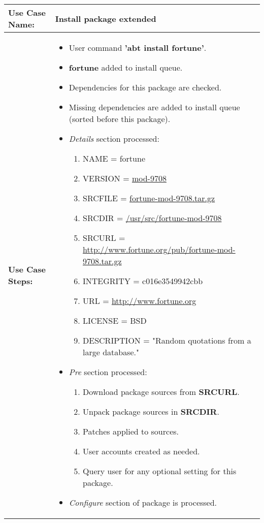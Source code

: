 \medskip

\begin{tabularx}{\linewidth}{|l|X|}
\hline
\textbf{Use Case Name:} & \textbf{Install package extended} \\
\hline
\textbf{Use Case Steps:} & 
\begin{minipage}{\linewidth} 
  \vspace{0.05em}
  \begin{itemize}
    \item User command \textbf{'abt install fortune'}.
    \item \textbf{fortune} added to install queue.
    \item Dependencies for this package are checked.
    \item Missing dependencies are added to install queue (sorted before this package).
    \item \emph{Details} section processed:
    \begin{enumerate}
      \item NAME = fortune
      \item VERSION = \url{mod-9708}
      \item SRCFILE = \url{fortune-mod-9708.tar.gz}
      \item SRCDIR = \url{/usr/src/fortune-mod-9708}
      \item SRCURL = \url{http://www.fortune.org/pub/fortune-mod-9708.tar.gz}
      \item INTEGRITY = c016e3549942cbb
      \item URL = \url{http://www.fortune.org}
      \item LICENSE = BSD
      \item DESCRIPTION = "Random quotations from a large database."
    \end{enumerate}
    \item \emph{Pre} section processed:
    \begin{enumerate}
      \item Download package sources from \textbf{SRCURL}.
      \item Unpack package sources in \textbf{SRCDIR}.
      \item Patches applied to sources.
      \item User accounts created as needed.
      \item Query user for any optional setting for this package.
    \end{enumerate}
    \item \emph{Configure} section of package is processed.

\end{itemize}
\end{minipage}
\end{tabularx}

